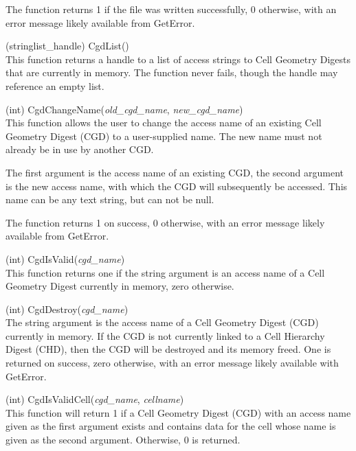 \begin{description}
The function returns 1 if the file was written successfully, 0
otherwise, with an error message likely available from {\vt GetError}.

\item{(stringlist\_handle) \vt CgdList()}\\
This function returns a handle to a list of access strings to Cell
Geometry Digests that are currently in memory.  The function never
fails, though the handle may reference an empty list.

\item{(int) \vt CgdChangeName({\it old\_cgd\_name\/},
 {\it new\_cgd\_name\/})}\\
This function allows the user to change the access name of an existing
Cell Geometry Digest (CGD) to a user-supplied name.  The new name must
not already be in use by another CGD.

The first argument is the access name of an existing CGD, the second
argument is the new access name, with which the CGD will subsequently
be accessed.  This name can be any text string, but can not be null.

The function returns 1 on success, 0 otherwise, with an error message
likely available from {\vt GetError}.

\item{(int) \vt CgdIsValid({\it cgd\_name\/})}\\
This function returns one if the string argument is an access name of
a Cell Geometry Digest currently in memory, zero otherwise.

\item{(int) \vt CgdDestroy({\it cgd\_name\/})}\\
The string argument is the access name of a Cell Geometry Digest (CGD)
currently in memory.  If the CGD is not currently linked to a Cell
Hierarchy Digest (CHD), then the CGD will be destroyed and its memory
freed.  One is returned on success, zero otherwise, with an error
message likely available with {\vt GetError}.

\item{(int) \vt CgdIsValidCell({\it cgd\_name\/}, {\it cellname\/})}\\
This function will return 1 if a Cell Geometry Digest (CGD) with an
access name given as the first argument exists and contains data for
the cell whose name is given as the second argument.  Otherwise, 0 is
returned.


\end{description}
